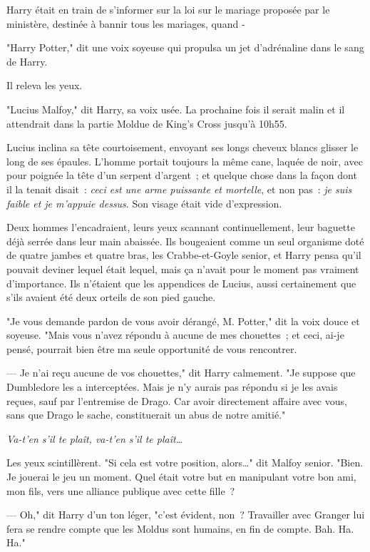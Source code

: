 Harry était en train de s'informer sur la loi sur le mariage proposée par le ministère, destinée à bannir tous les mariages, quand -

"Harry Potter," dit une voix soyeuse qui propulsa un jet d'adrénaline dans le sang de Harry.

Il releva les yeux.

"Lucius Malfoy," dit Harry, sa voix usée. La prochaine fois il serait malin et il attendrait dans la partie Moldue de King's Cross jusqu'à 10h55.

Lucius inclina sa tête courtoisement, envoyant ses longs cheveux blancs glisser le long de ses épaules. L'homme portait toujours la même cane, laquée de noir, avec pour poignée la tête d'un serpent d'argent~; et quelque chose dans la façon dont il la tenait disait~: \emph{ceci est une arme puissante et mortelle}, et non pas~: \emph{je suis faible et je m'appuie dessus}. Son visage était vide d'expression.

Deux hommes l'encadraient, leurs yeux scannant continuellement, leur baguette déjà serrée dans leur main abaissée. Ils bougeaient comme un seul organisme doté de quatre jambes et quatre bras, les Crabbe-et-Goyle senior, et Harry pensa qu'il pouvait deviner lequel était lequel, mais ça n'avait pour le moment pas vraiment d'importance. Ils n'étaient que les appendices de Lucius, aussi certainement que s'ils avaient été deux orteils de son pied gauche.

"Je vous demande pardon de vous avoir dérangé, M. Potter," dit la voix douce et soyeuse. "Mais vous n'avez répondu à aucune de mes chouettes~; et ceci, ai-je pensé, pourrait bien être ma seule opportunité de vous rencontrer.

--- Je n'ai reçu aucune de vos chouettes," dit Harry calmement. "Je suppose que Dumbledore les a interceptées. Mais je n'y aurais pas répondu si je les avais reçues, sauf par l'entremise de Drago. Car avoir directement affaire avec vous, sans que Drago le sache, constituerait un abus de notre amitié."

\emph{Va-t'en s'il te plaît, va-t'en s'il te plaît…}

Les yeux scintillèrent. "Si cela est votre position, alors…" dit Malfoy senior. "Bien. Je jouerai le jeu un moment. Quel était votre but en manipulant votre bon ami, mon fils, vers une alliance publique avec cette fille~?

--- Oh," dit Harry d'un ton léger, "c'est évident, non~? Travailler avec Granger lui fera se rendre compte que les Moldus sont humains, en fin de compte. Bah. Ha. Ha."

